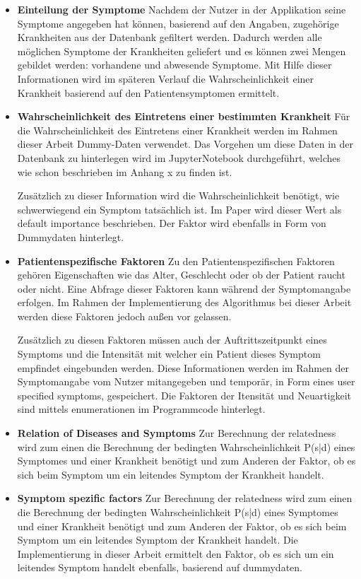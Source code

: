 \begin{itemize}
	\item \textbf{Einteilung der Symptome}
	\newline
	Nachdem der Nutzer in der Applikation seine Symptome angegeben hat können, basierend auf den Angaben, zugehörige Krankheiten aus der Datenbank gefiltert werden. Dadurch werden alle möglichen Symptome der Krankheiten geliefert und es können zwei Mengen gebildet werden: vorhandene und abwesende Symptome. Mit Hilfe dieser Informationen wird im späteren Verlauf die Wahrscheinlichkeit einer Krankheit basierend auf den Patientensymptomen ermittelt.

	\item \textbf{Wahrscheinlichkeit des Eintretens einer bestimmten Krankheit}
	\newline
	Für die Wahrscheinlichkeit des Eintretens einer Krankheit werden im Rahmen dieser Arbeit Dummy-Daten verwendet. Das Vorgehen um diese Daten in der Datenbank zu hinterlegen wird im JupyterNotebook durchgeführt, welches wie schon beschrieben im Anhang x zu finden ist. 
	
	Zusätzlich zu dieser Information wird die Wahrscheinlichkeit benötigt, wie schwerwiegend ein Symptom tatsächlich ist. Im Paper wird dieser Wert als default importance beschrieben. Der Faktor wird ebenfalls in Form von Dummydaten hinterlegt.
	
	\item \textbf{Patientenspezifische Faktoren}
	\newline
	Zu den Patientenspezifischen Faktoren gehören Eigenschaften wie das Alter, Geschlecht oder ob der Patient raucht oder nicht. Eine Abfrage dieser Faktoren kann während der Symptomangabe erfolgen. Im Rahmen der Implementierung des Algorithmus bei dieser Arbeit werden diese Faktoren jedoch außen vor gelassen.
	
	Zusätzlich zu diesen Faktoren müssen auch der Auftrittszeitpunkt eines Symptoms und die Intensität mit welcher ein Patient dieses Symptom empfindet eingebunden werden. Diese Informationen werden im Rahmen der Symptomangabe vom Nutzer mitangegeben und temporär, in Form eines user specified symptoms, gespeichert. Die Faktoren der Itensität und Neuartigkeit sind mittels enumerationen im Programmcode hinterlegt. 
	
	\item \textbf{Relation of Diseases and Symptoms}
	\newline
	Zur Berechnung der relatedness wird zum einen die Berechnung der bedingten Wahrscheinlichkeit P(s|d) eines Symptomes und einer Krankheit benötigt und zum Anderen der Faktor, ob es sich beim Symptom um ein leitendes Symptom der Krankheit handelt. 
	
	\item \textbf{Symptom spezific factors}
	\newline
	Zur Berechnung der relatedness wird zum einen die Berechnung der bedingten Wahrscheinlichkeit P(s|d) eines Symptomes und einer Krankheit benötigt und zum Anderen der Faktor, ob es sich beim Symptom um ein leitendes Symptom der Krankheit handelt. Die Implementierung in dieser Arbeit ermittelt den Faktor, ob es sich um ein leitendes Symptom handelt ebenfalls, basierend auf dummydaten.
\end{itemize}
